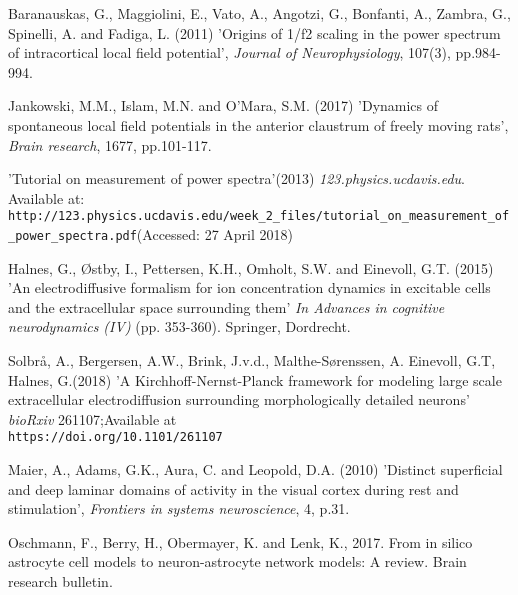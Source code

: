 \documentclass{article}
\begin{document}
\begin{thebibliography}{1}
Baranauskas, G., Maggiolini, E., Vato, A., Angotzi, G., Bonfanti, A., Zambra, G., Spinelli, A. and Fadiga, L. (2011) 'Origins of 1/f2 scaling in the power spectrum of intracortical local field potential', \textit{Journal of Neurophysiology}, 107(3), pp.984-994.

Jankowski, M.M., Islam, M.N. and O'Mara, S.M. (2017) 'Dynamics of spontaneous local field potentials in the anterior claustrum of freely moving rats', \textit{Brain research}, 1677, pp.101-117.

'Tutorial on measurement of power spectra'(2013) \textit{123.physics.ucdavis.edu}. Available at:
\\\texttt{http://123.physics.ucdavis.edu/week\_2\_files/tutorial\_on\_measurement\_of\_power\_spectra.pdf}(Accessed: 27 April 2018)

Halnes, G., Østby, I., Pettersen, K.H., Omholt, S.W. and Einevoll, G.T. (2015) 'An electrodiffusive formalism for ion concentration dynamics in excitable cells and the extracellular space surrounding them' \textit{In Advances in cognitive neurodynamics (IV)} (pp. 353-360). Springer, Dordrecht.


Solbr\aa, A., Bergersen, A.W., Brink, J.v.d., Malthe-Sørenssen, A. Einevoll, G.T, Halnes, G.(2018)
'A Kirchhoff-Nernst-Planck framework for modeling large scale extracellular electrodiffusion surrounding morphologically detailed neurons'
\textit{bioRxiv} 261107;Available at 
\\\texttt{https://doi.org/10.1101/261107}


Maier, A., Adams, G.K., Aura, C. and Leopold, D.A. (2010) 'Distinct superficial and deep laminar domains of activity in the visual cortex during rest and stimulation', \textit{Frontiers in systems neuroscience}, 4, p.31.

Oschmann, F., Berry, H., Obermayer, K. and Lenk, K., 2017. From in silico astrocyte cell models to neuron-astrocyte network models: A review. Brain research bulletin.


\end{thebibliography}
\end{document}
